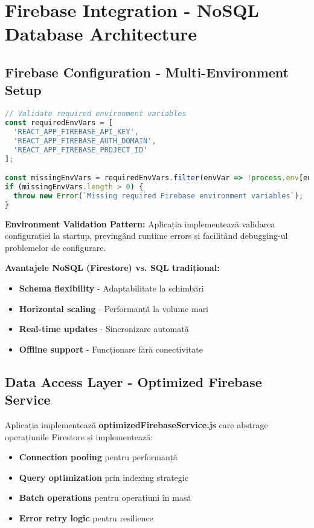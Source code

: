 \documentclass[11pt,a4paper]{article}
\begin{document}
\section{Firebase Integration - NoSQL Database Architecture}

\subsection{Firebase Configuration - Multi-Environment Setup}

\begin{lstlisting}[language=JavaScript, caption=Environment-Based Configuration]
// Validate required environment variables
const requiredEnvVars = [
  'REACT_APP_FIREBASE_API_KEY',
  'REACT_APP_FIREBASE_AUTH_DOMAIN',
  'REACT_APP_FIREBASE_PROJECT_ID'
];

const missingEnvVars = requiredEnvVars.filter(envVar => !process.env[envVar]);
if (missingEnvVars.length > 0) {
  throw new Error(`Missing required Firebase environment variables`);
}
\end{lstlisting}

\textbf{Environment Validation Pattern:} Aplicația implementează validarea configurației la startup, previngând runtime errors și facilitând debugging-ul problemelor de configurare.

\textbf{Avantajele NoSQL (Firestore) vs. SQL tradițional:}
\begin{itemize}
    \item \textbf{Schema flexibility} - Adaptabilitate la schimbări
    \item \textbf{Horizontal scaling} - Performanță la volume mari
    \item \textbf{Real-time updates} - Sincronizare automată
    \item \textbf{Offline support} - Funcționare fără conectivitate
\end{itemize}

\subsection{Data Access Layer - Optimized Firebase Service}

Aplicația implementează \textbf{optimizedFirebaseService.js} care abstrage operațiunile Firestore și implementează:
\begin{itemize}
    \item \textbf{Connection pooling} pentru performanță
    \item \textbf{Query optimization} prin indexing strategic
    \item \textbf{Batch operations} pentru operațiuni în masă
    \item \textbf{Error retry logic} pentru resilience
\end{itemize}
\end{document}
